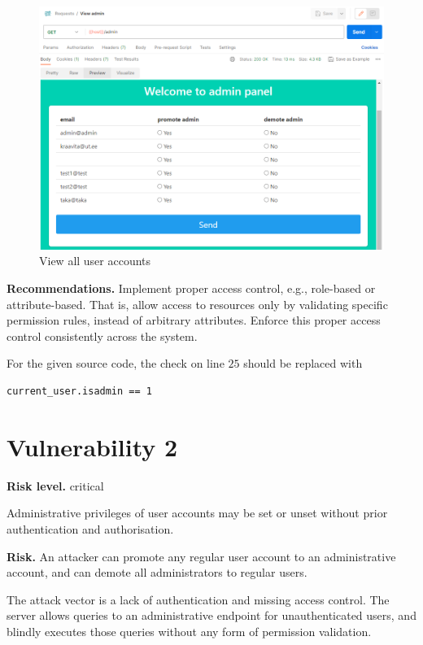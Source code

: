 \documentclass[parskip=half]{scrartcl}
\begin{document}
\begin{figure}
    \centering
    \includegraphics[width=\textwidth]{view_admin}
    \caption{View all user accounts}
    \label{fig:viewadm}
\end{figure}

\textbf{Recommendations.} Implement proper access control, e.g., role-based or
attribute-based. That is, allow access to resources only by validating specific
permission rules, instead of arbitrary attributes. Enforce this proper access
control consistently across the system.

For the given source code, the check on line $25$ should be replaced with
\begin{verbatim}
current_user.isadmin == 1
\end{verbatim}

\newpage

\section*{Vulnerability 2}

\textbf{Risk level.} critical

Administrative privileges of user accounts may be set or unset without prior
authentication and authorisation.

\textbf{Risk.} An attacker can promote any regular user account to an
administrative account, and can demote all administrators to regular users.

The attack vector is a lack of authentication and missing access control. The
server allows queries to an administrative endpoint for unauthenticated users,
and blindly executes those queries without any form of permission validation.
\end{document}
